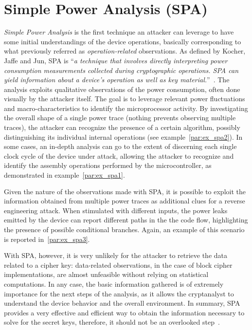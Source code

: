     \section{Simple Power Analysis (SPA)}\label{sec:spa}
        \emph{Simple Power Analysis} is the first technique an attacker can leverage to have some initial understandings of the device operations, basically corresponding to what previously referred as \emph{operation-related} observations. As defined by Kocher, Jaffe and Jun, SPA is ``\emph{a technique that involves directly interpreting power consumption measurements collected during cryptographic operations. SPA can yield information about a device’s operation as well as key material.}''~\cite{kocher1999differential}. The analysis exploits qualitative observations of the power consumption, often done visually by the attacker itself. The goal is to leverage relevant power fluctuations and macro-characteristics to identify the microprocessor activity. By investigating the overall shape of a single power trace (nothing prevents observing multiple traces), the attacker can recognize the presence of a certain algorithm, possibly distinguishing its individual internal operations (see example~\ref{par:ex_spa2}). In some cases, an in-depth analysis can go to the extent of discerning each single clock cycle of the device under attack, allowing the attacker to recognize and identify the assembly operations performed by the microcontroller, as demonstrated in example~\ref{par:ex_spa1}.

        Given the nature of the observations made with SPA, it is possible to exploit the information obtained from multiple power traces as additional clues for a reverse engineering attack. When stimulated with different inputs, the power leaks emitted by the device can report different paths in the the code flow, highlighting the presence of possible conditional branches. Again, an example of this scenario is reported in~\ref{par:ex_spa3}.
        
        With SPA, however, it is very unlikely for the attacker to retrieve the data related to a cipher key: data-related observations, in the case of block cipher implementations, are almost unfeasible without relying on statistical computations. In any case, the basic information gathered is of extremely importance for the next steps of the analysis, as it allows the cryptanalyst to understand the device behavior and the overall environment. In summary, SPA provides a very effective and efficient way to obtain the information necessary to solve for the secret keys, therefore, it should not be an overlooked step~\cite{kocher2011introduction}.

